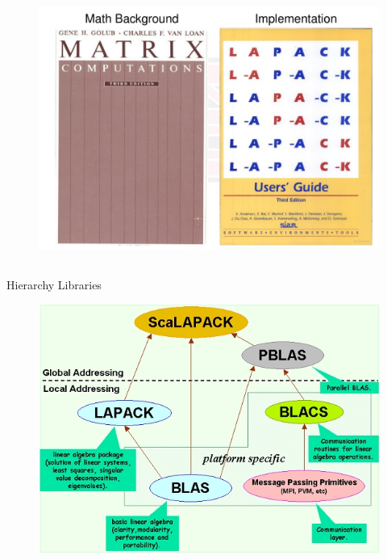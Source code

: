\documentclass[xcolor=x11names,compress]{beamer}
\renewcommand{\(}{\begin{columns}}
\renewcommand{\)}{\end{columns}}
\newcommand{\<}[1]{\begin{column}{#1}}
\renewcommand{\>}{\end{column}}
\begin{document}
\subsection{ }
\begin{frame}[fragile]{ }
\begin{figure}[htp]
\centering
\includegraphics[width=.7\textwidth,height=.7\textheight]{lapack.jpeg}
\label{fig1.eps}
\end{figure} 
\end{frame}
\subsection{ }
\begin{frame}[fragile]{Hierarchy Libraries}
\begin{figure}[htp]
\centering
\includegraphics[width=.7\textwidth,height=.7\textheight]{components.jpg}
\label{fig1.eps}
\end{figure} 
\end{frame}
\end{document}
